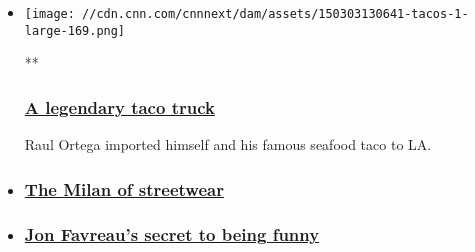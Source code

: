 \begin{itemize}
\item
  \href{/videos/us/2015/03/03/roy-choi-street-food-tacos.cnn}{}

  \texttt{[image: //cdn.cnn.com/cnnnext/dam/assets/150303130641-tacos-1-large-169.png]}

  **

  \hypertarget{a-legendary-taco-truck}{%
  \subsubsection{\texorpdfstring{\href{/videos/us/2015/03/03/roy-choi-street-food-tacos.cnn}{A
  legendary taco
  truck}}{A legendary taco truck}}\label{a-legendary-taco-truck}}

  Raul Ortega imported himself and his famous seafood taco to LA.
\item
  \hypertarget{the-milan-of-streetwear}{%
  \subsubsection{\texorpdfstring{\href{/videos/us/2015/03/03/roy-choi-street-food-fairfax.cnn}{The
  Milan of
  streetwear}}{The Milan of streetwear}}\label{the-milan-of-streetwear}}
\item
  \hypertarget{jon-favreaus-secret-to-being-funny}{%
  \subsubsection{\texorpdfstring{\href{/videos/us/2014/10/10/jon-favreau-director-roy-choi-street-food.cnn}{Jon
  Favreau's secret to being
  funny}}{Jon Favreau's secret to being funny}}\label{jon-favreaus-secret-to-being-funny}}
\end{itemize}

